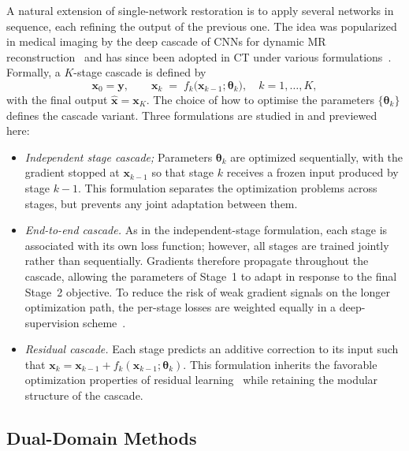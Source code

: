 A natural extension of single-network restoration is to apply several networks in sequence, each refining the output of the previous one. The idea was popularized in medical imaging by the deep cascade of CNNs for dynamic MR reconstruction~\cite{Schlemper2018} and has since been adopted in CT under various formulations~\cite{Wang2020, Zhang2022}. Formally, a $K$-stage cascade is defined by
\begin{equation}
    \boldsymbol{x}_{0} = \boldsymbol{y}, \qquad
    \boldsymbol{x}_{k} \;=\; f_{k}\!\bigl(\boldsymbol{x}_{k-1};\boldsymbol{\theta}_{k}\bigr),
    \quad k = 1,\ldots,K,
    \label{eq:cascade_generic}
\end{equation}
with the final output $\hat{\boldsymbol{x}} = \boldsymbol{x}_{K}$. The choice of how to optimise the parameters $\{\boldsymbol{\theta}_{k}\}$ defines the cascade variant.
Three formulations are studied in  and previewed here:
\begin{itemize}
    \item \emph{Independent stage cascade;} Parameters $\boldsymbol{\theta}_{k}$ are optimized sequentially, with the gradient stopped at $\boldsymbol{x}_{k-1}$ so that stage $k$ receives a frozen input produced by stage $k{-}1$. This formulation separates the optimization problems across stages, but prevents any joint adaptation between them.
    
    \item \emph{End-to-end cascade.} As in the independent-stage formulation, each stage is associated with its own loss function; however, all stages are trained jointly rather than sequentially. Gradients therefore propagate throughout the cascade, allowing the parameters of Stage~1 to adapt in response to the final Stage~2 objective. To reduce the risk of weak gradient signals on the longer optimization path, the per-stage losses are weighted equally in a deep-supervision scheme~\cite{He2016, LeCun2015}.
    
    \item \emph{Residual cascade.} Each stage predicts an additive correction to its input such that $\boldsymbol{x}_{k} = \boldsymbol{x}_{k-1} + f_{k}(\boldsymbol{x}_{k-1}; \boldsymbol{\theta}_{k})$. This formulation inherits the favorable optimization properties of residual learning~\cite{He2016, Zhang2017} while retaining the modular structure of the cascade.
\end{itemize}
\subsection{Dual-Domain Methods}
\label{subsec:bg_dual_domain}

